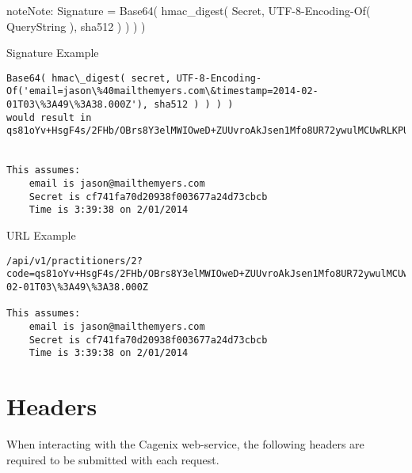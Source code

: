 \documentclass[letterpaper,10pt,english]{sphinxmanual}
\begin{document}
\begin{notice}{note}{Note:}
Signature = Base64( hmac\_digest( Secret, UTF-8-Encoding-Of( QueryString ), sha512 ) ) ) )
\end{notice}

Signature Example

\begin{Verbatim}[commandchars=\\\{\}]
Base64( hmac\_digest( secret, UTF-8-Encoding-Of('email=jason\%40mailthemyers.com\&timestamp=2014-02-01T03\%3A49\%3A38.000Z'), sha512 ) ) ) )
would result in
qs81oYv+HsgF4s/2FHb/OBrs8Y3elMWIOweD+ZUUvroAkJsen1Mfo8UR72ywulMCUwRLKPUwZj2qcMAc6tQpiA==


This assumes:
    email is jason@mailthemyers.com
    Secret is cf741fa70d20938f003677a24d73cbcb
    Time is 3:39:38 on 2/01/2014
\end{Verbatim}

URL Example

\begin{Verbatim}[commandchars=\\\{\}]
/api/v1/practitioners/2?code=qs81oYv+HsgF4s/2FHb/OBrs8Y3elMWIOweD+ZUUvroAkJsen1Mfo8UR72ywulMCUwRLKPUwZj2qcMAc6tQpiA==\&email=jason\%40mailthemyers.com\&timestamp=2014-02-01T03\%3A49\%3A38.000Z

This assumes:
    email is jason@mailthemyers.com
    Secret is cf741fa70d20938f003677a24d73cbcb
    Time is 3:39:38 on 2/01/2014
\end{Verbatim}


\section{Headers}
\label{dev-api-overview:headers}
When interacting with the Cagenix web-service, the following headers are
required to be submitted with each request.
\end{document}
